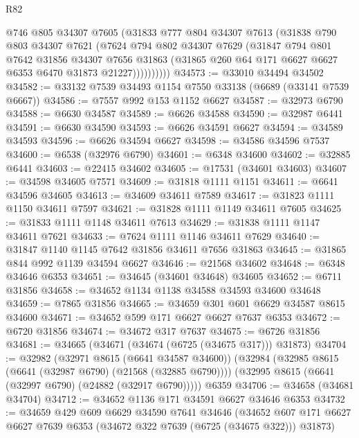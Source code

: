 \begin{lexlean}{R82}
\begin{coremodule}
              @746
              @805
              @34307
              @7605
              (@31833
                @777
                @804
                @34307
                @7613
                (@31838
                  @790
                  @803
                  @34307
                  @7621
                  (@7624
                    @794
                    @802
                    @34307
                    @7629
                    (@31847
                      @794
                      @801
                      @7642
                      @31856
                      @34307
                      @7656
                      @31863
                      (@31865 @260 @64 @171 @6627 @6627 @6353 @6470 @31873 @21227))))))))))
@34573 := @33010 @34494 @34502
@34582 := @33132 @7539 @34493 @1154 @7550 @33138 (@6689 (@33141 @7539 @6667))
@34586 := @7557 @992 @153 @1152 @6627
@34587 := @32973 @6790
@34588 := @6630 @34587
@34589 := @6626 @34588
@34590 := @32987 @6441
@34591 := @6630 @34590
@34593 := @6626 @34591 @6627
@34594 := @34589 @34593
@34596 := @6626 @34594 @6627
@34598 := @34586 @34596 @7537
@34600 := @6538 (@32976 @6790)
@34601 := @6348 @34600
@34602 := @32885 @6441
@34603 := @22415 @34602
@34605 := @17531 (@34601 @34603)
@34607 := @34598 @34605 @7571
@34609 := @31818 @1111 @1151
@34611 := @6641 @34596 @34605
@34613 := @34609 @34611 @7589
@34617 := @31823 @1111 @1150 @34611 @7597
@34621 := @31828 @1111 @1149 @34611 @7605
@34625 := @31833 @1111 @1148 @34611 @7613
@34629 := @31838 @1111 @1147 @34611 @7621
@34633 := @7624 @1111 @1146 @34611 @7629
@34640 := @31847 @1140 @1145 @7642 @31856 @34611 @7656 @31863
@34645 := @31865 @844 @992 @1139 @34594 @6627
@34646 := @21568 @34602
@34648 := @6348 @34646 @6353
@34651 := @34645 (@34601 @34648) @34605
@34652 := @6711 @31856
@34658 := @34652 @1134 @1138 @34588 @34593 @34600 @34648
@34659 := @7865 @31856
@34665 := @34659 @301 @601 @6629 @34587 @8615 @34600
@34671 := @34652 @599 @171 @6627 @6627 @7637 @6353
@34672 := @6720 @31856
@34674 := @34672 @317 @7637
@34675 := @6726 @31856
@34681 := @34665 (@34671 (@34674 (@6725 (@34675 @317))) @31873)
@34704 := @32982
    (@32971 @8615 (@6641 @34587 @34600))
    (@32984
      (@32985 @8615 (@6641 (@32987 @6790) (@21568 (@32885 @6790))))
      (@32995 @8615 (@6641 (@32997 @6790) (@24882 (@32917 @6790)))))
    @6359
@34706 := @34658 (@34681 @34704)
@34712 := @34652 @1136 @171 @34591 @6627 @34646 @6353
@34732 := @34659
    @429
    @609
    @6629
    @34590
    @7641
    @34646
    (@34652 @607 @171 @6627 @6627 @7639 @6353 (@34672 @322 @7639 (@6725 (@34675 @322))) @31873)

\end{coremodule}
\end{lexlean}
